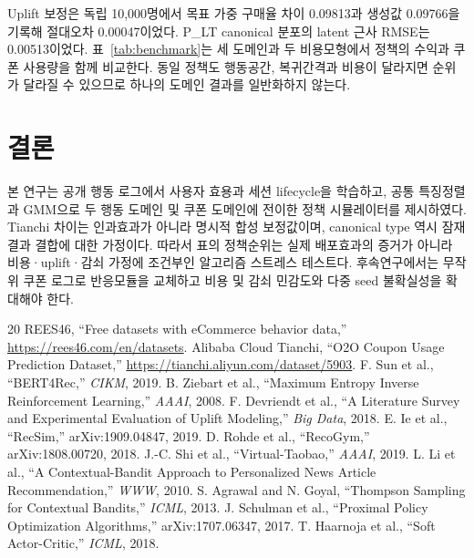 \documentclass[9pt,twocolumn]{extarticle}
\begin{document}
Uplift 보정은 독립 10,000명에서 목표 가중 구매율 차이 0.09813과 생성값
0.09766을 기록해 절대오차 0.00047이었다. P\_LT canonical 분포의 latent
근사 RMSE는 0.00513이었다. 표~\ref{tab:benchmark}는 세 도메인과 두 비용모형에서
정책의 수익과 쿠폰 사용량을 함께 비교한다. 동일 정책도 행동공간, 복귀간격과
비용이 달라지면 순위가 달라질 수 있으므로 하나의 도메인 결과를 일반화하지 않는다.

\section{결론}
본 연구는 공개 행동 로그에서 사용자 효용과 세션 lifecycle을 학습하고, 공통
특징정렬과 GMM으로 두 행동 도메인 및 쿠폰 도메인에 전이한 정책 시뮬레이터를
제시하였다. Tianchi 차이는 인과효과가 아니라 명시적 합성 보정값이며, canonical
type 역시 잠재결과 결합에 대한 가정이다. 따라서 표의 정책순위는 실제 배포효과의
증거가 아니라 비용·uplift·감쇠 가정에 조건부인 알고리즘 스트레스 테스트다.
후속연구에서는 무작위 쿠폰 로그로 반응모듈을 교체하고 비용 및 감쇠 민감도와
다중 seed 불확실성을 확대해야 한다.

\begingroup
\footnotesize
\setlength{\parindent}{0pt}
\begin{thebibliography}{20}
 REES46, ``Free datasets with eCommerce behavior data,'' \url{https://rees46.com/en/datasets}.
 Alibaba Cloud Tianchi, ``O2O Coupon Usage Prediction Dataset,'' \url{https://tianchi.aliyun.com/dataset/5903}.
 F. Sun et al., ``BERT4Rec,'' \textit{CIKM}, 2019.
 B. Ziebart et al., ``Maximum Entropy Inverse Reinforcement Learning,'' \textit{AAAI}, 2008.
 F. Devriendt et al., ``A Literature Survey and Experimental Evaluation of Uplift Modeling,'' \textit{Big Data}, 2018.
 E. Ie et al., ``RecSim,'' arXiv:1909.04847, 2019.
 D. Rohde et al., ``RecoGym,'' arXiv:1808.00720, 2018.
 J.-C. Shi et al., ``Virtual-Taobao,'' \textit{AAAI}, 2019.
 L. Li et al., ``A Contextual-Bandit Approach to Personalized News Article Recommendation,'' \textit{WWW}, 2010.
 S. Agrawal and N. Goyal, ``Thompson Sampling for Contextual Bandits,'' \textit{ICML}, 2013.
 J. Schulman et al., ``Proximal Policy Optimization Algorithms,'' arXiv:1707.06347, 2017.
 T. Haarnoja et al., ``Soft Actor-Critic,'' \textit{ICML}, 2018.
\end{thebibliography}
\endgroup
\end{document}
